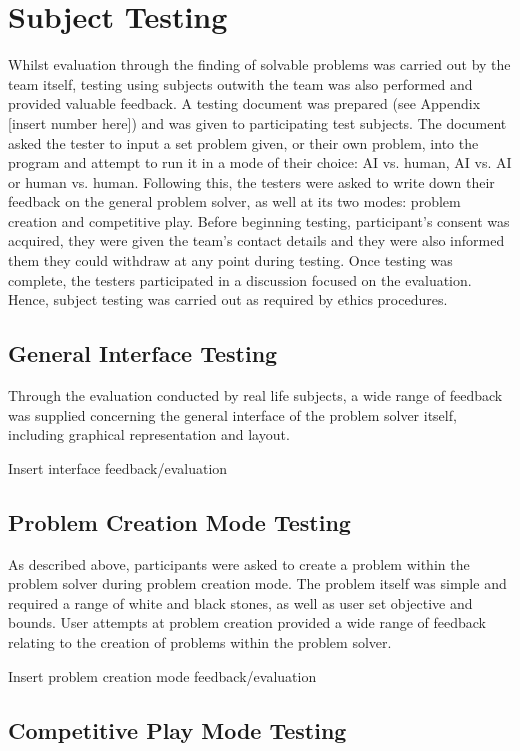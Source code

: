 \documentclass{l3proj}
\begin{document}
\section{Subject Testing}

Whilst evaluation through the finding of solvable problems was carried out by the team itself, testing using subjects outwith the team was also performed and provided valuable feedback. A testing document was prepared (see Appendix [insert number here]) and was given to participating test subjects. The document asked the tester to input a set problem given, or their own problem, into the program and attempt to run it in a mode of their choice: AI vs. human, AI vs. AI or human vs. human. Following this, the testers were asked to write down their feedback on the general problem solver, as well at its two modes: problem creation and competitive play. Before beginning testing, participant's consent was acquired, they were given the team's contact details and they were also informed them they could withdraw at any point during testing. Once testing was complete, the testers participated in a discussion focused on the evaluation. Hence, subject testing was carried out as required by ethics procedures.

\subsection{General Interface Testing}

Through the evaluation conducted by real life subjects, a wide range of feedback was supplied concerning the general interface of the problem solver itself, including graphical representation and layout.

Insert interface feedback/evaluation

\subsection{Problem Creation Mode Testing}

As described above, participants were asked to create a problem within the problem solver during problem creation mode. The problem itself was simple and required a range of white and black stones, as well as user set objective and bounds. User attempts at problem creation provided a wide range of feedback relating to the creation of problems within the problem solver.

Insert problem creation mode feedback/evaluation

\subsection{Competitive Play Mode Testing}
\end{document}
